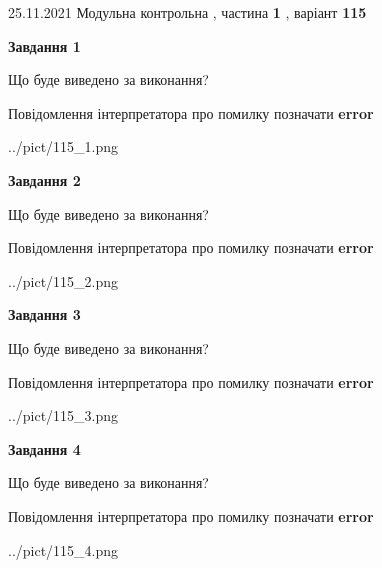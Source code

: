 \documentclass[10pt, ukrainian]{article}
\begin{document}
{25.11.2021 Модульна контрольна , частина \textbf { 1 }, варіант  \No \textbf { 115 }\par}
{
\begin {large}

{\begin {center}\textbf{Завдання 1}\end {center}}\par
Що буде виведено за виконання? \par
Повідомлення інтерпретатора про помилку позначати \textbf{error}

\begin{center}
	{../pict/115_1.png}
\end{center}
\newpage

{\begin {center}\textbf{Завдання 2}\end {center}}\par
Що буде виведено за виконання? \par
Повідомлення інтерпретатора про помилку позначати \textbf{error}

\begin{center}
	{../pict/115_2.png}
\end{center}
\newpage

{\begin {center}\textbf{Завдання 3}\end {center}}\par
Що буде виведено за виконання? \par
Повідомлення інтерпретатора про помилку позначати \textbf{error}

\begin{center}
	{../pict/115_3.png}
\end{center}
\newpage

{\begin {center}\textbf{Завдання 4}\end {center}}\par
Що буде виведено за виконання? \par
Повідомлення інтерпретатора про помилку позначати \textbf{error}

\begin{center}
	{../pict/115_4.png}
\end{center}
\newpage


\end{large}}
\end{document}
